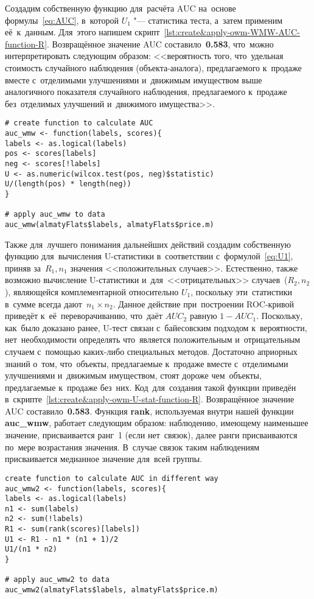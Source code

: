 \documentclass[]{scrreprt}
\begin{document}
Создадим собственную функцию для~расчёта AUC на~основе формулы~\ref{eq:AUC}, в~которой $U_{1}$ "--- статистика теста, а~затем применим её~к~данным. Для~этого напишем скрипт~\ref{lst:create&apply-owm-WMW-AUC-function-R}. Возвращённое значение AUC составило~\textbf{0.583}, что~можно интерпретировать следующим образом: <<вероятность того, что~удельная стоимость случайного наблюдения (объекта-аналога), предлагаемого к~продаже вместе с~отделимыми улучшениями и~движимым имуществом выше аналогичного показателя случайного наблюдения, предлагаемого к~продаже без~отделимых улучшений и~движимого имущества>>.
%
\begin{lstlisting}[float, caption = Создание собственной функции для~расчёта AUC и~её~применение к~данным рынка Алматы, firstnumber=1, label= lst:create&apply-owm-WMW-AUC-function-R]
# create function to calculate AUC
auc_wmw <- function(labels, scores){
labels <- as.logical(labels)
pos <- scores[labels]
neg <- scores[!labels]
U <- as.numeric(wilcox.test(pos, neg)$statistic)
U/(length(pos) * length(neg))
}

# apply auc_wmw to data
auc_wmw(almatyFlats$labels, almatyFlats$price.m)
\end{lstlisting}
%

Также для~лучшего понимания дальнейших действий создадим собственную функцию для~вычисления U-статистики в~соответствии с~формулой~\ref{eq:U1}, приняв за~$R_{1}, n_{1}$ значения <<положительных случаев>>. Естественно, также возможно вычисление U-статистики и~для~<<отрицательных>> случаев~($R_{2}, n_{2}$), являющейся комплементарной относительно $U_{1}$, поскольку эти~статистики в~сумме всегда дают~$n_{1} \times n_{2}$. Данное действие при~построении ROC-кривой приведёт к~её~переворачиванию, что~даёт $AUC_{2}$ равную $1-AUC_{1}$. Поскольку, как~было доказано ранее, U-тест связан с~байесовским подходом к~вероятности, нет~необходимости определять что~является положительным и~отрицательным случаем с~помощью каких-либо специальных методов. Достаточно априорных знаний о~том, что~объекты, предлагаемые к~продаже вместе с~отделимыми улучшениями и~движимым имуществом, стоят дороже чем~объекты, предлагаемые к~продаже без~них. Код~для~создания такой функции приведён в~скрипте~\ref{lst:create&apply-owm-U-stat-function-R}. Возвращённое значение AUC составило~\textbf{0.583}. Функция \textbf{rank}, используемая внутри нашей функции \textbf{auc\_wmw}, работает следующим образом: наблюдению, имеющему наименьшее значение, присваивается ранг~1 (если нет~связок), далее ранги присваиваются по~мере возрастания значения. В~случае связок таким наблюдениям присваивается медианное значение для~всей группы.
%
\begin{lstlisting}[float, caption = Создание собственной функции для~вычисления U-статистики и~её~применение к~данным рынка Алматы, firstnumber=1, label= lst:create&apply-owm-U-stat-function-R]
 create function to calculate AUC in different way
auc_wmw2 <- function(labels, scores){
labels <- as.logical(labels)
n1 <- sum(labels)
n2 <- sum(!labels)
R1 <- sum(rank(scores)[labels])
U1 <- R1 - n1 * (n1 + 1)/2
U1/(n1 * n2)
}

# apply auc_wmw2 to data
auc_wmw2(almatyFlats$labels, almatyFlats$price.m)
\end{lstlisting}
%
\end{document}
